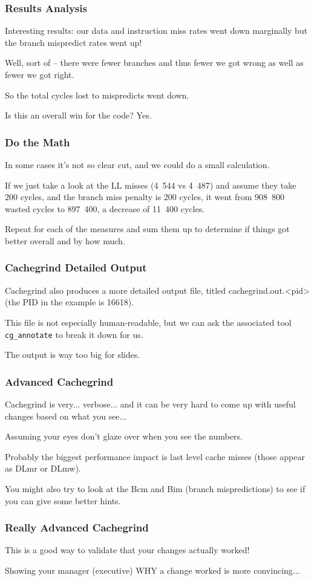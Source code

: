 \begin{frame}
\frametitle{Results Analysis}


Interesting results: our data and instruction miss rates went down marginally but the branch mispredict rates went up!

Well, sort of -- there were fewer branches and thus fewer we got wrong as well as fewer we got right. 

So the total cycles lost to mispredicts went down. 

Is this an overall win for the code? Yes. 


\end{frame}
\begin{frame}
\frametitle{Do the Math}

In some cases it's not so clear cut, and we could do a small calculation. 

If we just take a look at the LL misses (4~544 vs 4~487) and assume they take 200 cycles, and the branch miss penalty is 200 cycles, it went from 908~800 wasted cycles to 897~400, a decrease of 11~400 cycles.

  Repeat for each of the measures and sum them up to determine if things got better overall and by how much.

\end{frame}
\begin{frame}
\frametitle{Cachegrind Detailed Output}

Cachegrind also produces a more detailed output file, titled cachegrind.out.<pid> (the PID in the example is 16618). 

This file is not especially human-readable, but we can ask the associated tool \texttt{cg\_annotate} to break it down for us.

The output is way too big for slides.

\end{frame}
\begin{frame}
\frametitle{Advanced Cachegrind}

Cachegrind is very... verbose... and it can be very hard to come up with useful changes based on what you see... 

Assuming your eyes don't glaze over when you see the numbers. 

Probably the biggest performance impact is last level cache misses (those appear as DLmr or DLmw). 

You might also try to look at the Bcm and Bim (branch mispredictions) to see if you can give some better hints. 
\end{frame}
\begin{frame}
\frametitle{Really Advanced Cachegrind}

This is a good way to validate that your changes actually worked!

Showing your manager (executive) WHY a change worked is more convincing...

\end{frame}

